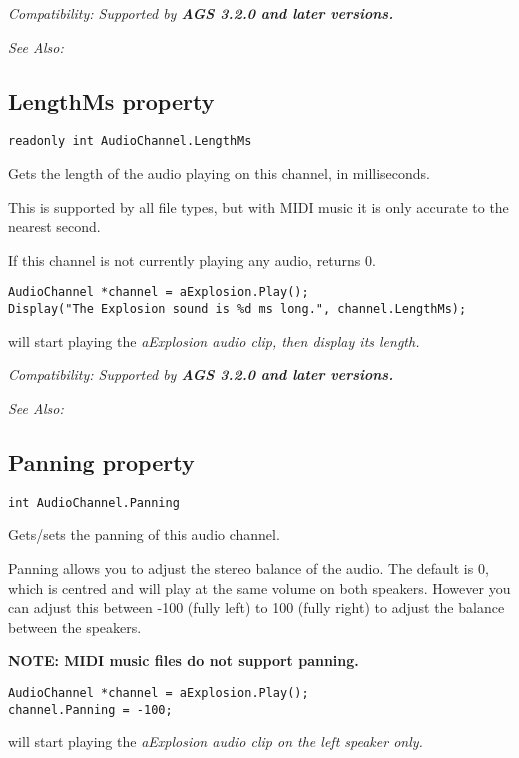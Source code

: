 \it{Compatibility:} Supported by \bf{AGS 3.2.0} and later versions.

\it{See Also:} 


\subsection{LengthMs property}\label{AudioChannel.LengthMs}%

\begin{verbatim}
readonly int AudioChannel.LengthMs
\end{verbatim}
Gets the length of the audio playing on this channel, in milliseconds.

This is supported by all file types, but with MIDI music it is only accurate to the nearest second.

If this channel is not currently playing any audio, returns 0.

\begin{verbatim}
AudioChannel *channel = aExplosion.Play();
Display("The Explosion sound is %d ms long.", channel.LengthMs);
\end{verbatim}
will start playing the \it{aExplosion} audio clip, then display its length.

\it{Compatibility:} Supported by \bf{AGS 3.2.0} and later versions.

\it{See Also:} 


\subsection{Panning property}\label{AudioChannel.Panning}%

\begin{verbatim}
int AudioChannel.Panning
\end{verbatim}
Gets/sets the panning of this audio channel.

Panning allows you to adjust the stereo balance of the audio. The default is 0, which is
centred and will play at the same volume on both speakers. However you can adjust this
between -100 (fully left) to 100 (fully right) to adjust the balance between the speakers.

\bf{NOTE:} MIDI music files do not support panning.

\begin{verbatim}
AudioChannel *channel = aExplosion.Play();
channel.Panning = -100;
\end{verbatim}
will start playing the \it{aExplosion} audio clip on the left speaker only.

